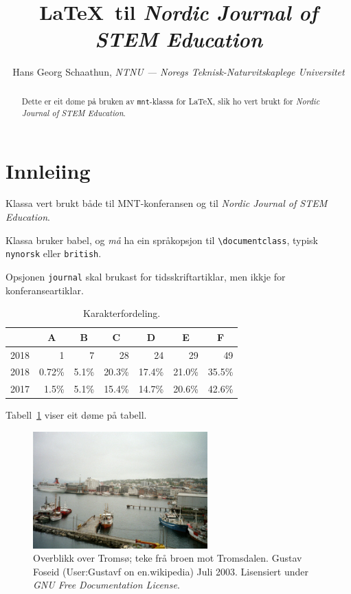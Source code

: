 \documentclass[nynorsk,journal]{mnt}
\title{\LaTeX\ til \emph{Nordic Journal of STEM Education}}
\author{Hans Georg Schaathun,
\emph{NTNU --- Noregs Teknisk-Naturvitskaplege Universitet}}
\begin{document}
\maketitle

\begin{abstract}
   Dette er eit døme på bruken av \texttt{mnt}-klassa for
   \LaTeX, slik ho vert brukt for \emph{Nordic Journal of STEM Education}.
\end{abstract}

\section{Innleiing}

Klassa vert brukt både til MNT-konferansen og til
\emph{Nordic Journal of STEM Education}.

Klassa bruker babel, og \emph{må} ha ein språkopsjon til
\verb|\documentclass|, typisk \texttt{nynorsk} eller \texttt{british}.

Opsjonen \texttt{journal} skal brukast for tidsskriftartiklar, 
men ikkje for konferanseartiklar.

\begin{table}
\centering
  \caption{Karakterfordeling.}
  \begin{tabular}{l|r|r|r|r|r|r|}
     & \multicolumn{1}{c|}{A}
     & \multicolumn{1}{c|}{B}
     & \multicolumn{1}{c|}{C}
     & \multicolumn{1}{c|}{D}
     & \multicolumn{1}{c|}{E}
     & \multicolumn{1}{c|}{F} \\
  \hline
  2018 & 1 & 7 & 28 & 24 & 29 & 49 \\
  \hline
  2018 &
  \num{0.72}\% &
  \num{5.1}\% &
  \num{20.3}\% &
  \num{17.4}\% &
  \num{21.0}\% &
  \num{35.5}\%  \\
  \hline
  2017 &
  \num{1.5}\% &
  \num{5.1}\% &
  \num{15.4}\% &
  \num{14.7}\% &
  \num{20.6}\% &
  \num{42.6}\% \\
  \hline
  \end{tabular}
  \label{tab:grade}
\end{table}


Tabell~\ref{tab:grade} viser eit døme på tabell.

\begin{figure}
\begin{center}
  \includegraphics[width=0.6\textwidth]{tromso}
\end{center}
  \caption{Overblikk over Tromsø; teke frå broen mot Tromsdalen.
    Gustav Foseid (User:Gustavf on en.wikipedia)
    Juli 2003.
    Lisensiert under \emph{GNU Free Documentation License}.
    }
  \label{fig}
\end{figure}
\end{document}
